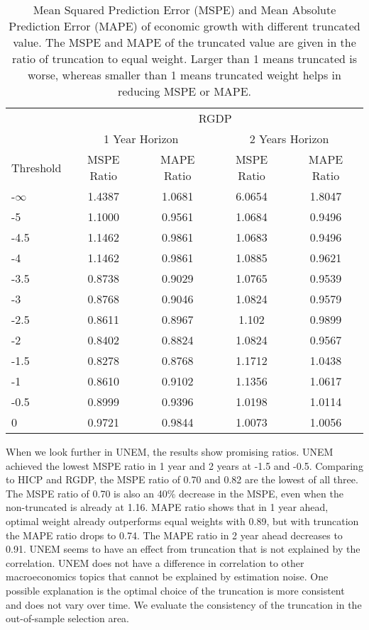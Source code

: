 \documentclass[11pt]{article}
\begin{document}
\begin{table}[!h]
	\centering
	\caption{Mean Squared Prediction Error (MSPE) and Mean Absolute Prediction Error (MAPE) of economic growth with different truncated value. The MSPE and MAPE of the truncated value are given in the ratio of truncation to equal weight. Larger than 1 means truncated is worse, whereas smaller than 1 means truncated weight helps in reducing MSPE or MAPE.}
	\label{tab: MSPE RGDP}
	\begin{tabular}{lcccc}
		\hline
		& \multicolumn{4}{c}{RGDP}                                                \\
		\cmidrule(lr){2-5}
		& \multicolumn{2}{c}{1 Year Horizon} & \multicolumn{2}{c}{2 Years Horizon} \\
		\cmidrule(lr){2-3} \cmidrule(lr){4-5}
		Threshold & MSPE Ratio &    MAPE Ratio    & MSPE Ratio &    MAPE Ratio    \\ \hline
		\hline
		-$\infty$ & 1.4387 & 1.0681 & 6.0654 & 1.8047\\ 
		-5 & 1.1000 & 0.9561 & 1.0684 & 0.9496\\ 
		-4.5 & 1.1462 & 0.9861 & 1.0683 & 0.9496\\ 
		-4 & 1.1462 & 0.9861 & 1.0885 & 0.9621\\ 
		-3.5 & 0.8738 & 0.9029 & 1.0765 & 0.9539\\ 
		-3 & 0.8768 & 0.9046 & 1.0824 & 0.9579\\ 
		-2.5 & 0.8611 & 0.8967 & 1.102 & 0.9899\\ 
		-2 & 0.8402 & 0.8824 & 1.0824 & 0.9567\\ 
		-1.5 & 0.8278 & 0.8768 & 1.1712 & 1.0438\\ 
		-1 & 0.8610 & 0.9102 & 1.1356 & 1.0617\\ 
		-0.5 & 0.8999 & 0.9396 & 1.0198 & 1.0114\\ 
		0 & 0.9721 & 0.9844 & 1.0073 & 1.0056\\  \hline
	\end{tabular}
\end{table}


When we look further in UNEM, the results show promising ratios. UNEM achieved the lowest MSPE ratio in 1 year and 2 years at -1.5 and -0.5. Comparing to HICP and RGDP, the MSPE ratio of 0.70 and 0.82 are the lowest of all three. The MSPE ratio of 0.70 is also an 40\% decrease in the MSPE, even when the non-truncated is already at 1.16. MAPE ratio shows that in 1 year ahead, optimal weight already outperforms equal weights with 0.89, but with truncation the MAPE ratio drops to 0.74. The MAPE ratio in 2 year ahead decreases to 0.91. UNEM seems to have an effect from truncation that is not explained by the correlation. UNEM does not have a difference in correlation to other macroeconomics topics that cannot be explained by estimation noise. One possible explanation is the optimal choice of the truncation is more consistent and does not vary over time. We evaluate the consistency of the truncation in the out-of-sample selection area.
\end{document}
